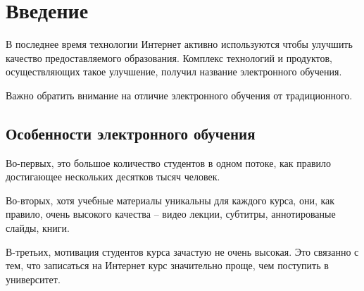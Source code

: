 \documentclass{matmex-diploma-custom}
\begin{document}
\maketitle
\tableofcontents
\section*{Введение}

В последнее время технологии Интернет активно используются чтобы
улучшить качество предоставляемого образования. Комплекс технологий и
продуктов, осуществляющих такое улучшение, получил название
электронного обучения.

Важно обратить внимание на отличие электронного обучения от
традиционного.

\subsection*{Особенности электронного обучения}

Во-первых, это большое количество студентов в одном потоке, как
правило достигающее нескольких десятков тысяч человек.

Во-вторых, хотя учебные материалы уникальны для каждого курса, они,
как правило, очень высокого качества -- видео лекции, субтитры,
аннотированые слайды, книги.

В-третьих, мотивация студентов курса зачастую не очень высокая. Это
связанно с тем, что записаться на Интернет курс значительно проще, чем
поступить в университет.
\end{document}
